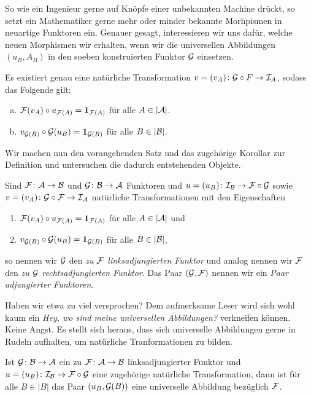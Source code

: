 So wie ein Ingenieur gerne auf Knöpfe einer unbekannten Machine drückt, so setzt ein Mathematiker gerne mehr oder minder bekannte Morhpismen in neuartige Funktoren ein. Genauer gesagt, interessieren wir uns dafür, welche neuen Morphismen wir erhalten, wenn wir die universellen Abbildungen $(u_B, A_B)$ in den soeben konstruierten Funktor $\mathcal{G}$ einsetzen.

\begin{kor}
  Es existiert genau eine natürliche Transformation $v = (v_A) \colon \mathcal{G} \circ F \to \mathcal{I}_A$, sodass das Folgende gilt:
  \begin{enumerate}[(a)]
    \item $\mathcal{F}(v_A) \circ u_{\mathcal{F}(A)} = \mathbf{1}_{\mathcal{F}(A)}$ für alle $A \in |\mathcal{A}|$.
    \item $v_{\mathcal{G}(B)} \circ \mathcal{G}(u_B) = \mathbf{1}_{\mathcal{G}(B)}$ für alle $B \in |\mathcal{B}|$.
  \end{enumerate}
\end{kor}

Wir machen nun den vorangehenden Satz und das zugehörige Korollar zur Definition und untersuchen die dadurch entstehenden Objekte.

\begin{defn}
  Sind $\mathcal{F} \colon \mathcal{A} \to \mathcal{B}$ und $\mathcal{G} \colon \mathcal{B} \to \mathcal{A}$ Funktoren und $u = (u_B) \colon \mathcal{I}_{\mathcal{B}} \to \mathcal{F} \circ \mathcal{G}$ sowie $v = (v_A) \colon \mathcal{G} \circ \mathcal{F} \to \mathcal{I}_{\mathcal{A}}$ natürliche Transformationen mit den Eigenschaften
  \begin{enumerate}[(1)]
    \item $\mathcal{F}(v_A) \circ u_{\mathcal{F}(A)} = \mathbf{1}_{\mathcal{F}(A)}$ für alle $A \in |\mathcal{A}|$ und
    \item $v_{\mathcal{G}(B)} \circ \mathcal{G}(u_B) = \mathbf{1}_{\mathcal{G}(B)}$ für alle $B \in |\mathcal{B}|$,
  \end{enumerate}
  so nennen wir $\mathcal{G}$ den \emph{zu $\mathcal{F}$ linksadjungierten Funktor} und analog nennen wir $\mathcal{F}$ den \emph{zu $\mathcal{G}$ rechtsadjungierten Funktor}.
  Das Paar $(\mathcal{G}, \mathcal{F})$ nennen wir ein \emph{Paar adjungierter Funktoren}.
\end{defn}

Haben wir etwa zu viel versprochen?
Dem aufmerksame Leser wird sich wohl kaum ein \emph{Hey, wo sind meine universellen Abbildungen?} verkneifen können.
Keine Angst.
Es stellt sich heraus, dass sich universelle Abbildungen gerne in Rudeln aufhalten, um natürliche Tranformationen zu bilden.

\begin{thm}
  Ist $\mathcal{G} \colon \mathcal{B} \to \mathcal{A}$ ein zu $\mathcal{F} \colon \mathcal{A} \to \mathcal{B}$ linksadjungierter Funktor und $u = (u_B) \colon \mathcal{I}_{\mathcal{B}} \to \mathcal{F} \circ \mathcal{G}$ eine zugehörige natürliche Transformation, dann ist für alle $B \in |B|$ das Paar $(u_B, \mathcal{G}(B))$ eine universelle Abbildung bezüglich $\mathcal{F}$.
\end{thm}

